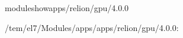 \documentclass[a4paper,10pt,english]{sphinxmanual}
\begin{document}
\begin{sphinxVerbatim}[commandchars=\\\{\}]
\PYGZdl{}\PYGZgt{}moduleshowapps/relion/gpu/4.0.0

\PYGZhy{}\PYGZhy{}\PYGZhy{}\PYGZhy{}\PYGZhy{}\PYGZhy{}\PYGZhy{}\PYGZhy{}\PYGZhy{}\PYGZhy{}\PYGZhy{}\PYGZhy{}\PYGZhy{}\PYGZhy{}\PYGZhy{}\PYGZhy{}\PYGZhy{}\PYGZhy{}\PYGZhy{}\PYGZhy{}\PYGZhy{}\PYGZhy{}\PYGZhy{}\PYGZhy{}\PYGZhy{}\PYGZhy{}\PYGZhy{}\PYGZhy{}\PYGZhy{}\PYGZhy{}\PYGZhy{}\PYGZhy{}\PYGZhy{}\PYGZhy{}\PYGZhy{}\PYGZhy{}\PYGZhy{}\PYGZhy{}\PYGZhy{}\PYGZhy{}\PYGZhy{}\PYGZhy{}\PYGZhy{}\PYGZhy{}\PYGZhy{}\PYGZhy{}\PYGZhy{}\PYGZhy{}\PYGZhy{}\PYGZhy{}\PYGZhy{}\PYGZhy{}\PYGZhy{}\PYGZhy{}\PYGZhy{}\PYGZhy{}\PYGZhy{}\PYGZhy{}\PYGZhy{}\PYGZhy{}\PYGZhy{}\PYGZhy{}\PYGZhy{}\PYGZhy{}\PYGZhy{}\PYGZhy{}\PYGZhy{}
/tem/el7/Modules/apps/apps/relion/gpu/4.0.0:


\end{sphinxVerbatim}
\end{document}
